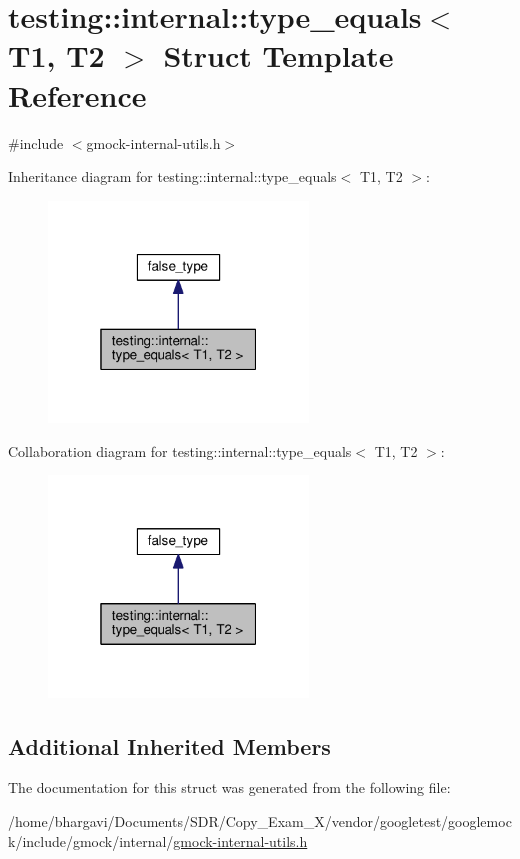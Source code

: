 \hypertarget{structtesting_1_1internal_1_1type__equals}{}\section{testing\+:\+:internal\+:\+:type\+\_\+equals$<$ T1, T2 $>$ Struct Template Reference}
\label{structtesting_1_1internal_1_1type__equals}


{\ttfamily \#include $<$gmock-\/internal-\/utils.\+h$>$}



Inheritance diagram for testing\+:\+:internal\+:\+:type\+\_\+equals$<$ T1, T2 $>$\+:
\nopagebreak
\begin{figure}[H]
\begin{center}
\leavevmode
\includegraphics[width=196pt]{structtesting_1_1internal_1_1type__equals__inherit__graph}
\end{center}
\end{figure}


Collaboration diagram for testing\+:\+:internal\+:\+:type\+\_\+equals$<$ T1, T2 $>$\+:
\nopagebreak
\begin{figure}[H]
\begin{center}
\leavevmode
\includegraphics[width=196pt]{structtesting_1_1internal_1_1type__equals__coll__graph}
\end{center}
\end{figure}
\subsection*{Additional Inherited Members}


The documentation for this struct was generated from the following file\+:\begin{DoxyCompactItemize}
\item 
/home/bhargavi/\+Documents/\+S\+D\+R/\+Copy\+\_\+\+Exam\+\_\+X/vendor/googletest/googlemock/include/gmock/internal/\hyperlink{gmock-internal-utils_8h}{gmock-\/internal-\/utils.\+h}\end{DoxyCompactItemize}
